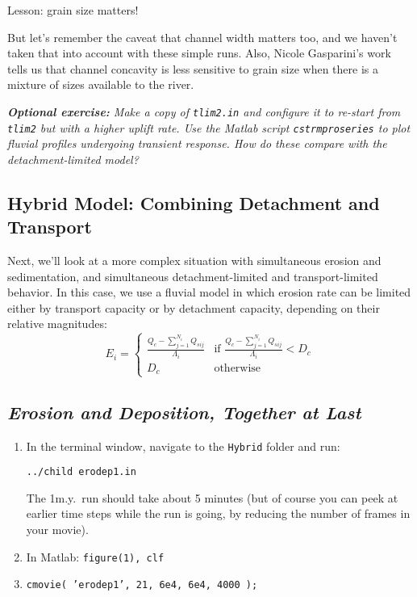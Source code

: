 \documentclass[12pt]{amsart}
\begin{document}
Lesson: grain size matters! 

But let's remember the caveat that channel width matters too, and we haven't taken that into account with these simple runs. Also, Nicole Gasparini's work \citep{gasparini1999downstream,gasparini2004network} tells us that channel concavity is less sensitive to grain size when there is a mixture of sizes available to the river.

{\em {\bf Optional exercise:} Make a copy of {\tt tlim2.in} and configure it to re-start from {\tt tlim2} but with a higher uplift rate. Use the Matlab script {\tt cstrmproseries} to plot fluvial profiles undergoing transient response. How do these compare with the detachment-limited model?}

\subsection{Hybrid Model: Combining Detachment and Transport}

Next, we'll look at a more complex situation with simultaneous erosion and sedimentation, and simultaneous detachment-limited and transport-limited behavior. In this case, we use a fluvial model in which erosion rate can be limited either by transport capacity or by detachment capacity, depending on their relative magnitudes:
\begin{equation}
E_i =
\begin{cases}
\frac{Q_c - \sum_{j=1}^{N_i} Q_{sij}}{\Lambda_i} & \text{if $\frac{Q_c - \sum_{j=1}^{N_i} Q_{sij}}{\Lambda_i} < D_c$} \\
D_c & \text{otherwise}
\end{cases}
\end{equation}

\subsection*{\em Erosion and Deposition, Together at Last}

{ \em
\begin{enumerate}
\item
In the terminal window, navigate to the {\tt Hybrid} folder and run:

{\tt ../child erodep1.in}

\noindent
The 1m.y.\ run should take about 5 minutes (but of course you can peek at earlier time steps while the run is going, by reducing the number of frames in your movie).
\item
In Matlab: {\tt figure(1), clf}
\item
{\tt cmovie( 'erodep1', 21, 6e4, 6e4, 4000 );}
\end{enumerate}
}
\end{document}
